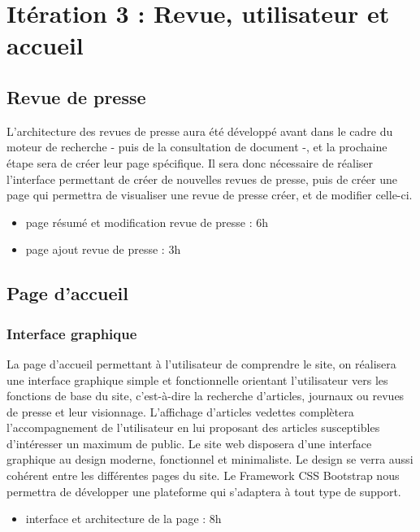 \section{Itération 3 : Revue, utilisateur et accueil}
\label{subsec:revue_util_accueil}
	\subsection{Revue de presse}
	\label{subsec:revue}

		L'architecture des revues de presse aura été développé avant dans le cadre du moteur de recherche - puis de la consultation de document -, et la prochaine étape sera de créer leur page spécifique. Il sera donc nécessaire de réaliser l'interface permettant de créer de nouvelles revues de presse, puis de créer une page qui permettra de visualiser une revue de presse créer, et de modifier celle-ci.

		\begin{itemize}
			\item page résumé et modification revue de presse : 6h
			\item page ajout revue de presse : 3h
		\end{itemize}

	\subsection{Page d'accueil}
	\label{subsec:accueil}
		\subsubsection{Interface graphique}
		\label{subsubsec:acc_interface}
			
			La page d'accueil permettant à l'utilisateur de comprendre le site, on réalisera une interface graphique simple et fonctionnelle orientant l'utilisateur vers les fonctions de base du site, c'est-à-dire la recherche d'articles, journaux ou revues de presse et leur visionnage. L'affichage d'articles vedettes complètera l'accompagnement de l'utilisateur en lui proposant des articles susceptibles d'intéresser un maximum de public.
			Le site web disposera d'une interface graphique au design moderne, fonctionnel et minimaliste. Le design se verra aussi cohérent entre les différentes pages du site. Le Framework CSS Bootstrap nous permettra de développer une plateforme qui s'adaptera à tout type de support.

			\begin{itemize}
				\item interface et architecture de la page : 8h
			\end{itemize}

